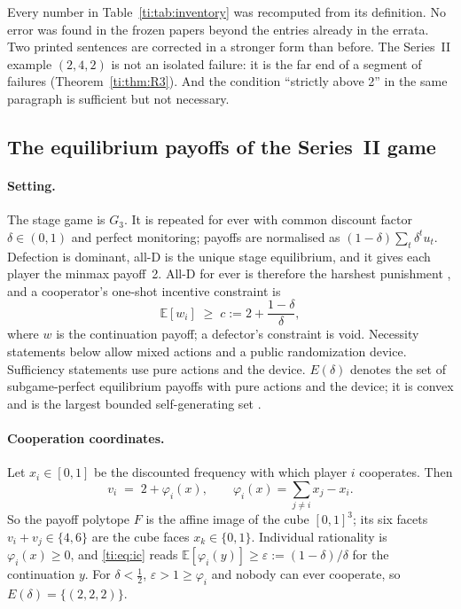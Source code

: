 \documentclass[11pt]{amsart}
\theoremstyle{remark}
\begin{document}
Every number in Table~\ref{ti:tab:inventory} was recomputed from its definition. No error was found
in the frozen papers beyond the entries already in the errata. Two printed sentences are corrected
in a stronger form than before. The Series~II example $(2,4,2)$ is not an isolated failure: it is
the far end of a segment of failures (Theorem~\ref{ti:thm:R3}). And the condition ``strictly above
2'' in the same paragraph is sufficient but not necessary.

\subsection{The equilibrium payoffs of the Series~II game}\label{ti:sec:game}

\paragraph{Setting.} The stage game is $G_3$. It is repeated for ever with common discount factor
$\delta\in(0,1)$ and perfect monitoring; payoffs are normalised as $(1-\delta)\sum_t\delta^tu_t$.
Defection is dominant, all-D is the unique stage equilibrium, and it gives each player the minmax
payoff~2. All-D for ever is therefore the harshest punishment \cite{Abreu88}, and a
cooperator's one-shot incentive constraint is
\begin{equation}\label{ti:eq:ic}
  \mathbb E[w_i]\;\ge\;c:=2+\frac{1-\delta}{\delta},
\end{equation}
where $w$ is the continuation payoff; a defector's constraint is void. Necessity statements below
allow mixed actions and a public randomization device. Sufficiency statements use pure actions
and the device. $E(\delta)$ denotes the set of subgame-perfect equilibrium payoffs with pure
actions and the device; it is convex and is the largest bounded self-generating set
\cite{APS90}.

\paragraph{Cooperation coordinates.} Let $x_i\in[0,1]$ be the discounted frequency with which
player $i$ cooperates. Then
\begin{equation}\label{ti:eq:coords}
  v_i \;=\; 2+\varphi_i(x),\qquad \varphi_i(x)=\sum_{j\ne i}x_j-x_i .
\end{equation}
So the payoff polytope $F$ is the affine image of the cube $[0,1]^3$; its six facets
$v_i+v_j\in\{4,6\}$ are the cube faces $x_k\in\{0,1\}$. Individual rationality is
$\varphi_i(x)\ge0$, and \eqref{ti:eq:ic} reads $\mathbb E[\varphi_i(y)]\ge\varepsilon:=(1-\delta)/\delta$
for the continuation $y$. For $\delta<\frac12$, $\varepsilon>1\ge\varphi_i$ and nobody can ever
cooperate, so $E(\delta)=\{(2,2,2)\}$.
\end{document}
